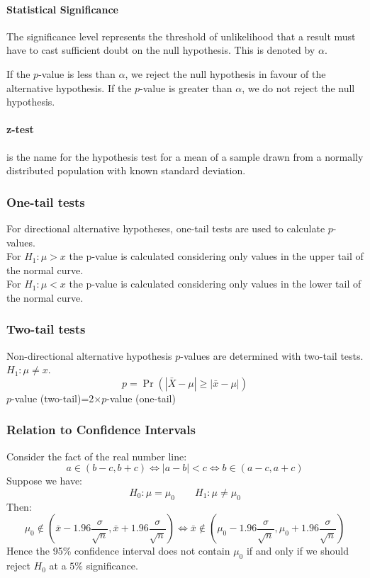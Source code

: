 \documentclass[a4paper,twoside]{article}
\begin{document}
			\paragraph{Statistical Significance} The significance level represents the threshold of unlikelihood that a result must have to cast sufficient doubt on the null hypothesis. This is denoted by $\alpha$.
			
			If the $p$-value is less than $\alpha$, we reject the null hypothesis in favour of the alternative hypothesis. If the $p$-value is greater than $\alpha$, we do not reject the null hypothesis.
			
			\paragraph{z-test} is the name for the hypothesis test for a mean of a sample drawn from a normally distributed population with known standard deviation.
			
			\subsubsection{One-tail tests}
				For directional alternative hypotheses, one-tail tests are used to calculate $p$-values.\\
				For $H_1:\mu>x$ the p-value is calculated considering only values in the upper tail of the normal curve.\\
				For $H_1:\mu<x$ the p-value is calculated considering only values in the lower tail of the normal curve.\\
			\subsubsection{Two-tail tests}
				Non-directional alternative hypothesis $p$-values are determined with two-tail tests. $H_1:\mu\neq x$.\\
				\[
					p=\Pr\left(\left|\bar{X}-\mu\right|\geq\left|\bar{x}-\mu\right|\right)
				\]
				$p$-value (two-tail)=2$\times p$-value (one-tail)
			\subsubsection{Relation to Confidence Intervals}
				Consider the fact of the real number line:
				\[
					a\in\left(b-c,b+c\right)\iff|a-b|<c\iff b\in(a-c,a+c)
				\]
				Suppose we have:
				\[
					H_0:\mu=\mu_0 \qquad H_1:\mu\neq\mu_0
				\]
				Then:
				\[
					\mu_0\notin\left(\bar{x}-1.96\frac{\sigma}{\sqrt{n}},\bar{x}+1.96\frac{\sigma}{\sqrt{n}}\right)\iff\bar{x}\notin\left(\mu_0-1.96\frac{\sigma}{\sqrt{n}},\mu_0+1.96\frac{\sigma}{\sqrt{n}}\right)
				\]
				Hence the 95\% confidence interval does not contain $\mu_0$ if and only if we should reject $H_0$ at a $5\%$ significance.
\end{document}
